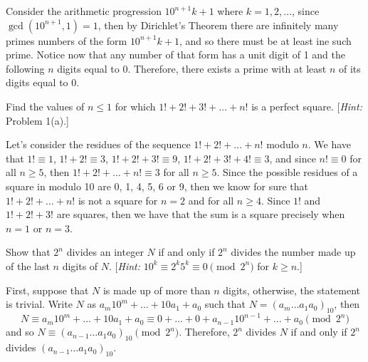 \begin{solution}
    Consider the arithmetic progression $10^{n+1}k + 1$ where $k = 1,2,\dots$, since $\gcd(10^{n+1}, 1) = 1$, then by Dirichlet's Theorem there are infinitely many primes numbers of the form $10^{n+1}k + 1$, and so there must be at least ine such prime. Notice now that any number of that form has a unit digit of 1 and the following $n$ digits equal to 0. Therefore, there exists a prime with at least $n$ of its digits equal to 0. \\
\end{solution}

\begin{exercise}
    Find the values of $n \leq 1$ for which $1! + 2! + 3! + \dots + n!$ is a perfect square. [\textit{Hint:} Problem 1(a).] \\
\end{exercise}

\begin{solution}
    Let's consider the residues of the sequence $1! + 2! + ... + n!$ modulo $n$. We have that $1! \equiv 1$, $1! + 2! \equiv 3$, $1! + 2! + 3! \equiv 9$, $1! + 2! + 3! + 4! \equiv 3$, and since $n! \equiv 0$ for all $n \geq 5$, then $1! + 2! + \dots + n! \equiv 3$ for all $n \geq 5$. Since the possible residues of a square in modulo 10 are 0, 1, 4, 5, 6 or 9, then we know for sure that $1! + 2! + \dots + n!$ is not a square for $n = 2$ and for all $n \geq 4$. Since $1!$ and $1! + 2! + 3!$ are squares, then we have that the sum is a square precisely when $n = 1$ or $n = 3$.\\
\end{solution}

\begin{exercise}
    Show that $2^n$ divides an integer $N$ if and only if $2^n$ divides the number made up of the last $n$ digits of $N$. [\textit{Hint:} $10^k \equiv 2^k 5^k \equiv 0 \pmod{2^n}$ for $k \geq n$.] \\
\end{exercise}

\begin{solution}
    First, suppose that $N$ is made up of more than $n$ digits, otherwise, the statement is trivial. Write $N$ as $a_m10^m + \dots + 10a_1 + a_0$ such that $N = (a_m\dots a_1a_0)_{10}$, then
    $$N \equiv a_m10^m + \dots + 10a_1 + a_0 \equiv 0 + \dots + 0 + a_{n-1}10^{n-1} + \dots + a_0 \pmod{2^n}$$
    and so $N \equiv (a_{n-1}\dots a_1a_0)_{10} \pmod{2^n}$. Therefore, $2^n$ divides $N$ if and only if $2^n$ divides $(a_{n-1}\dots a_1a_0)_{10}$. \\
\end{solution}

